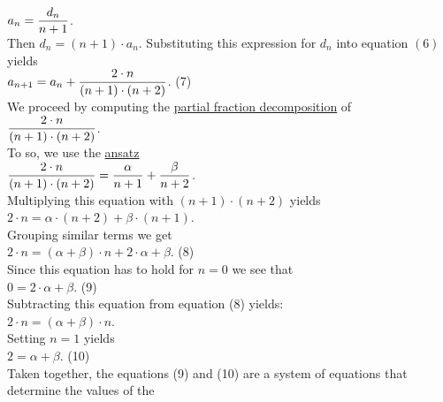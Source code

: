 \\[0.2cm]
\hspace*{1.3cm}
$\displaystyle a_n = \frac{d_n}{n+1}$. 
\\[0.2cm] 
Then $d_n = (n+1) \cdot a_n$.  Substituting this expression for $d_n$ into equation $(6)$ yields
\\[0.2cm]
\hspace*{1.3cm}
$\displaystyle a_{n+1} = a_{n} + \frac{2\cdot n}{(n+1)\cdot(n+2)}$.  \hspace*{\fill} (7)
\\[0.2cm]
We proceed by computing the 
\href{http://en.wikipedia.org/wiki/Partial_fraction}{partial fraction decomposition}
of 
\\[0.2cm]
\hspace*{1.3cm}
$\displaystyle\frac{2\cdot n}{(n+1)\cdot(n+2)}$.
\\[0.2cm] 
To so, we use the \href{http://en.wikipedia.org/wiki/Ansatz}{ansatz}
\\[0.2cm]
\hspace*{1.3cm}
$\displaystyle\frac{2\cdot n}{(n+1)\cdot(n+2)} = \frac{\alpha}{n+1} + \frac{\beta}{n+2}$.
\\[0.2cm] 
Multiplying this equation with $(n+1) \cdot (n+2)$ yields
\\[0.2cm]
\hspace*{1.3cm}
$ 2\cdot n = \alpha \cdot (n+2) + \beta \cdot (n+1)$. 
\\[0.2cm]
Grouping similar terms we get
\\[0.2cm]
\hspace*{1.3cm}
$2\cdot n = (\alpha + \beta) \cdot n + 2 \cdot \alpha  + \beta$. \hspace*{\fill} (8)
\\[0.2cm]
Since this equation has to hold for $n = 0$ we see that
\\[0.2cm]
\hspace*{1.3cm}
$0 = 2 \cdot \alpha + \beta$.  \hspace*{\fill} (9)
\\[0.2cm]
Subtracting this equation from equation (8) yields:
\\[0.2cm]
\hspace*{1.3cm}
$2 \cdot n  =  (\alpha + \beta) \cdot n$.
\\[0.2cm]
Setting $n=1$ yields
\\[0.2cm]
\hspace*{1.3cm}
$2  =  \alpha + \beta$.  \hspace*{\fill} (10)
\\[0.2cm]
Taken together, the equations (9) and (10) are a system of equations that determine the values of the

